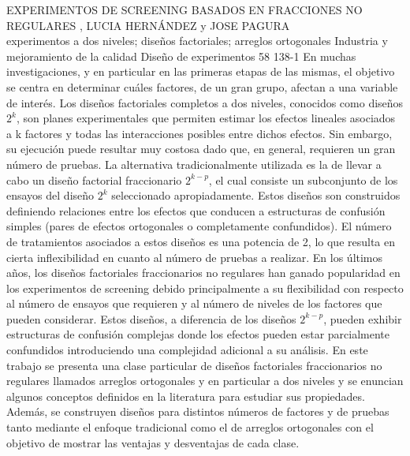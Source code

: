 \A
{EXPERIMENTOS DE SCREENING BASADOS EN FRACCIONES NO REGULARES}
{, LUCIA HERNÁNDEZ y JOSE PAGURA}
{
\\}
{experimentos a dos niveles; diseños factoriales; arreglos ortogonales} 
 {Industria y mejoramiento de la calidad} 
 {Diseño de experimentos} 
 {58} 
 {138-1}
{En muchas investigaciones, y en particular en las primeras etapas de las mismas, el objetivo se centra en determinar cuáles factores, de un gran grupo, afectan a una variable de interés. Los diseños factoriales completos a dos niveles, conocidos como diseños $2^k$, son planes experimentales que permiten estimar los efectos lineales asociados a k factores y todas las interacciones posibles entre dichos efectos. Sin embargo, su ejecución puede resultar muy costosa dado que, en general, requieren un gran número de pruebas. La alternativa tradicionalmente utilizada es la de llevar a cabo un diseño factorial fraccionario $2^{k-p}$, el cual consiste un subconjunto de los ensayos del diseño $2^k$ seleccionado apropiadamente. Estos diseños son construidos definiendo relaciones entre los efectos que conducen a estructuras de confusión simples (pares de efectos ortogonales o completamente confundidos). El número de tratamientos asociados a estos diseños es una potencia de 2, lo que resulta en cierta inflexibilidad en cuanto al número de pruebas a realizar. En los últimos años, los diseños factoriales fraccionarios no regulares han ganado popularidad en los experimentos de screening debido principalmente a su flexibilidad con respecto al número de ensayos que requieren y al número de niveles de los factores que pueden considerar. Estos diseños, a diferencia de los diseños $2^{k-p}$, pueden exhibir estructuras de confusión complejas donde los efectos pueden estar parcialmente confundidos introduciendo una complejidad adicional a su análisis. En este trabajo se presenta una clase particular de diseños factoriales fraccionarios no regulares llamados arreglos ortogonales y en particular a dos niveles y se enuncian algunos conceptos definidos en la literatura para estudiar sus propiedades. Además, se construyen diseños para distintos números de factores y de pruebas tanto mediante el enfoque tradicional como el de arreglos ortogonales con el objetivo de mostrar las ventajas y desventajas de cada clase.}
